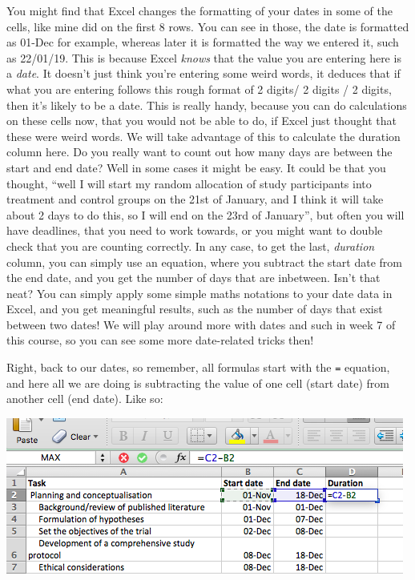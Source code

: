 \documentclass[
]{book}
\begin{document}
You might find that Excel changes the formatting of your dates in some of the cells, like mine did on the first 8 rows. You can see in those, the date is formatted as 01-Dec for example, whereas later it is formatted the way we entered it, such as 22/01/19. This is because Excel \emph{knows} that the value you are entering here is a \emph{date}. It doesn't just think you're entering some weird words, it deduces that if what you are entering follows this rough format of 2 digits/ 2 digits / 2 digits, then it's likely to be a date. This is really handy, because you can do calculations on these cells now, that you would not be able to do, if Excel just thought that these were weird words. We will take advantage of this to calculate the duration column here. Do you really want to count out how many days are between the start and end date? Well in some cases it might be easy. It could be that you thought, ``well I will start my random allocation of study participants into treatment and control groups on the 21st of January, and I think it will take about 2 days to do this, so I will end on the 23rd of January'', but often you will have deadlines, that you need to work towards, or you might want to double check that you are counting correctly. In any case, to get the last, \emph{duration} column, you can simply use an equation, where you subtract the start date from the end date, and you get the number of days that are inbetween. Isn't that neat? You can simply apply some simple maths notations to your date data in Excel, and you get meaningful results, such as the number of days that exist between two dates! We will play around more with dates and such in week 7 of this course, so you can see some more date-related tricks then!

Right, back to our dates, so remember, all formulas start with the \texttt{=} equation, and here all we are doing is subtracting the value of one cell (start date) from another cell (end date). Like so:

\includegraphics{imgs/calc_dur.png}
\end{document}
